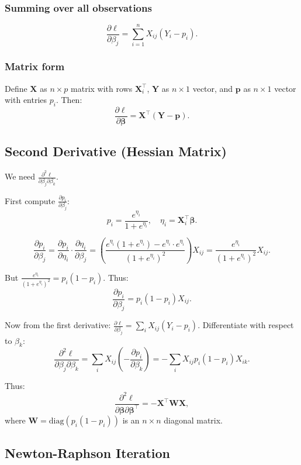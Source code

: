 \documentclass[12pt]{article}
\numberwithin{equation}{section}
\begin{document}
	\subsubsection{Summing over all observations}
	\[
	\frac{\partial \ell}{\partial \beta_j} = \sum_{i=1}^n X_{ij} (Y_i - p_i).
	\]
	
	\subsubsection{Matrix form}
	Define $\mathbf{X}$ as $n \times p$ matrix with rows $\mathbf{X}_i^\top$, $\mathbf{Y}$ as $n \times 1$ vector, and $\mathbf{p}$ as $n \times 1$ vector with entries $p_i$. Then:
	\[
	\frac{\partial \ell}{\partial \boldsymbol{\beta}} = \mathbf{X}^\top (\mathbf{Y} - \mathbf{p}).
	\]
	
	\subsection{Second Derivative (Hessian Matrix)}
	
	We need $\frac{\partial^2 \ell}{\partial \beta_j \partial \beta_k}$.
	
	First compute $\frac{\partial p_i}{\partial \beta_j}$:
	\[
	p_i = \frac{e^{\eta_i}}{1+e^{\eta_i}}, \quad \eta_i = \mathbf{X}_i^\top \boldsymbol{\beta}.
	\]
	
	\[
	\frac{\partial p_i}{\partial \beta_j} = \frac{\partial p_i}{\partial \eta_i} \cdot \frac{\partial \eta_i}{\partial \beta_j} = \left( \frac{e^{\eta_i}(1+e^{\eta_i}) - e^{\eta_i} \cdot e^{\eta_i}}{(1+e^{\eta_i})^2} \right) X_{ij} = \frac{e^{\eta_i}}{(1+e^{\eta_i})^2} X_{ij}.
	\]
	
	But $\frac{e^{\eta_i}}{(1+e^{\eta_i})^2} = p_i(1-p_i)$. Thus:
	\[
	\frac{\partial p_i}{\partial \beta_j} = p_i(1-p_i) X_{ij}.
	\]
	
	Now from the first derivative: $\frac{\partial \ell}{\partial \beta_j} = \sum_i X_{ij}(Y_i - p_i)$. Differentiate with respect to $\beta_k$:
	\[
	\frac{\partial^2 \ell}{\partial \beta_j \partial \beta_k} = \sum_i X_{ij} \left( -\frac{\partial p_i}{\partial \beta_k} \right) = -\sum_i X_{ij} p_i(1-p_i) X_{ik}.
	\]
	
	Thus:
	\[
	\frac{\partial^2 \ell}{\partial \boldsymbol{\beta} \partial \boldsymbol{\beta}^\top} = -\mathbf{X}^\top \mathbf{W} \mathbf{X},
	\]
	where $\mathbf{W} = \text{diag}(p_i(1-p_i))$ is an $n \times n$ diagonal matrix.
	
	\subsection{Newton-Raphson Iteration}
	
\end{document}
